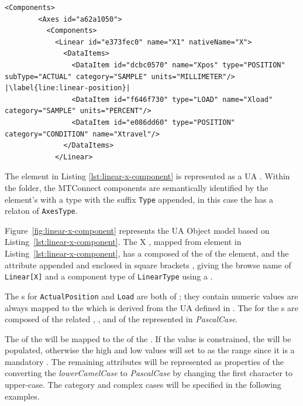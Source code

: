 \begin{lstlisting}[firstnumber=last,escapechar=|,%
    caption={Components and Conditions},label={lst:linear-x-component}]
      <Components>
        <Axes id="a62a1050">
          <Components>
            <Linear id="e373fec0" name="X1" nativeName="X">
              <DataItems>
                <DataItem id="dcbc0570" name="Xpos" type="POSITION" subType="ACTUAL" category="SAMPLE" units="MILLIMETER"/> |\label{line:linear-position}|
                <DataItem id="f646f730" type="LOAD" name="Xload" category="SAMPLE" units="PERCENT"/>
                <DataItem id="e086dd60" type="POSITION" category="CONDITION" name="Xtravel"/>
              </DataItems>
            </Linear>
\end{lstlisting}

The  element in Listing \ref{lst:linear-x-component} is represented as a UA . Within the folder, the MTConnect components are semantically identified by the element's  with a type with the suffix \texttt{Type} appended, in this case the    has a  relaton of \texttt{AxesType}. 



Figure~\ref{fig:linear-x-component} represents the UA Object model based on  Listing~\ref{lst:linear-x-component}. The  X , mapped from  element in Listing~\ref{lst:linear-x-component}, has a  composed of the  of the element, and the  attribute appended and enclosed in square brackets \element{[X]}, giving the browse name of \texttt{Linear[X]} and a component type of \texttt{LinearType} using a  .

The s for \texttt{ActualPosition} and \texttt{Load} are both of  ; they contain numeric values are always mapped to the  which is derived from the UA  defined in \cite{UAPart8}. The  for the s are composed of the related  , , and  of the  represented in \textit{PascalCase}.

The  of the  will be mapped to the   of the . If the value is constrained, the  will be populated, otherwise the high and low values will set to  as the range since it is a mandatory . The remaining attributes will be represented as properties of the  converting the \textit{lowerCamelCase} to \textit{PascalCase} by changing the first character to upper-case. The  category and complex cases will be specified in the following examples.


